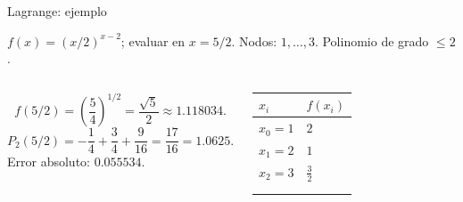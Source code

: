 \documentclass[original_version/main.tex]{subfiles}
\begin{document}
\begin{frame}[t]{Lagrange: ejemplo}
\par\noindent\begin{minipage}[t][7.5mm][t]{\textwidth}\small\strut $f(x)=(x/2)^{x-2}$; evaluar en $x=5/2$. Nodos: $1,\ldots,3$. Polinomio de grado $\le 2$.\end{minipage}\par\nointerlineskip
\begin{columns}[T]\small\setlength{\abovedisplayskip}{4pt}\setlength{\belowdisplayskip}{4pt}\[f(5/2)=\left(\frac54\right)^{1/2}=\frac{\sqrt5}{2}\approx1.118034.\]\[P_2(5/2)=-\frac14+\frac34+\frac9{16}=\frac{17}{16}=1.0625.\]\small Error absoluto: $0.055534$.\begingroup\small\setlength{\tabcolsep}{3pt}\begin{center}\begin{tabular}{|C{.42\textwidth}|C{.42\textwidth}|}\hline
\rule[-2mm]{0pt}{6mm}$x_i$&$f(x_i)$\\\hline
\rule[-2.5mm]{0pt}{6mm}$x_0=1$&$2$\\\hline
\rule[-2.5mm]{0pt}{6mm}$x_1=2$&$1$\\\hline
\rule[-2.5mm]{0pt}{6mm}$x_2=3$&$\frac{3}{2}$\\\hline
\rule[-2.5mm]{0pt}{6mm}&\\\hline
\rule[-2.5mm]{0pt}{6mm}&\\\hline
\end{tabular}\end{center}\endgroup\par
\end{columns}
\end{frame}
\end{document}
